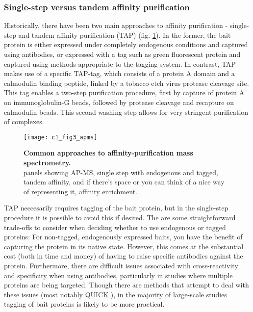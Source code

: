 \documentclass[a4paper,11pt,twoside,openright]{scrbook}
\begin{document}
\subsubsection{Single-step versus tandem affinity purification}
Historically, there have been two main approaches to affinity purification - single-step and tandem affinity purification \cite{Rigaut1999} (TAP) (fig. \ref{c1fig3}). In the former, the bait protein is either expressed under completely endogenous conditions and captured using antibodies, or expressed with a tag such as green fluorescent protein \cite{Hubner2010} and captured using methods appropriate to the tagging system. In contrast, TAP makes use of a specific TAP-tag, which consists of a protein A domain and a calmodulin binding peptide, linked by a tobacco etch virus protease cleavage site. This tag enables a two-step purification procedure, first by capture of protein A on immunoglobulin-G beads, followed by protease cleavage and recapture on calmodulin beads. This second washing step allows for very stringent purification of complexes.

\begin{figure}[h]
    \texttt{[image: c1\_fig3\_apms]}
    \caption[Common approaches to affinity-purification mass spectrometry]{\sffamily \textbf{Common approaches to affinity-purification mass spectrometry.} \\  panels showing AP-MS, single step with endogenous and tagged, tandem affinity, and if there's space or you can think of a nice way of representing it, affinity enrichment.}
    \label{c1fig3}
\end{figure}

TAP neccesarily requires tagging of the bait protein, but in the single-step procedure it is possible to avoid this if desired. The are some straightforward trade-offs to consider when deciding whether to use endogenous or tagged proteins: For non-tagged, endogenously expressed baits, you have the benefit of capturing the protein in its native state. However, this comes at the substantial cost (both in time and money) of having to raise specific antibodies against the protein. Furthermore, there are difficult issues associated with cross-reactivity and specificity when using antibodies, particularly in studies where multiple proteins are being targeted. Though there are methods that attempt to deal with these issues (most notably QUICK \cite{Selbach2006}), in the majority of large-scale studies tagging of bait proteins is likely to be more practical.
\end{document}
